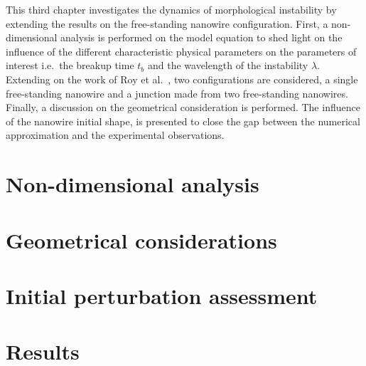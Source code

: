This third chapter investigates the dynamics of morphological instability by extending the results on the free-standing nanowire configuration. First, a non-dimensional analysis is performed on the model equation to shed light on the influence of the different characteristic physical parameters on the parameters of interest i.e.\ the breakup time $t_b$ and the wavelength of the instability $\lambda$. Extending on the work of Roy et al.\ \cite{RoyVarmaGururajan2021}, two configurations are considered, a single free-standing nanowire and a junction made from two free-standing nanowires. Finally, a discussion on the geometrical consideration is performed. The influence of the nanowire initial shape, is presented to close the gap between the numerical approximation and the experimental observations.
\section{Non-dimensional analysis}
    

\section{Geometrical considerations}
    

\section{Initial perturbation assessment}
    

\section{Results}
    
